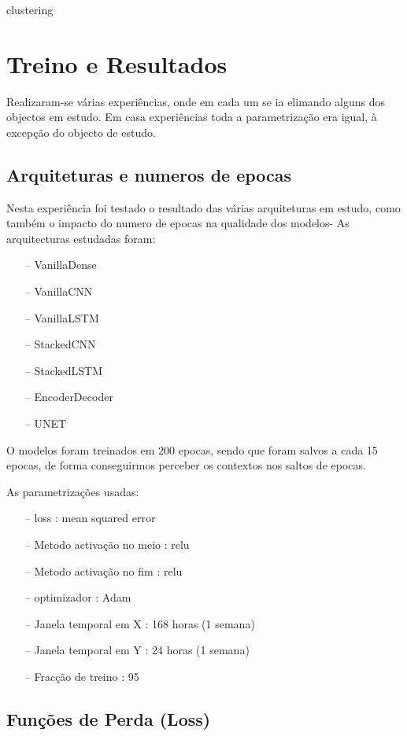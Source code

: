 clustering


\section{Treino e Resultados  \label{se:training}}

Realizaram-se várias experiências, onde em cada um se ia elimando alguns dos objectos em estudo.
Em casa experiências toda a parametrização era igual, à excepção do objecto de estudo.

\subsection{Arquiteturas e numeros de epocas}

Nesta experiência foi testado o resultado das várias arquiteturas em estudo, como também o impacto do numero de epocas na qualidade dos modelos-
As arquitecturas estudadas foram:

\begin{itemize}
    \item[--] VanillaDense
    \item[--] VanillaCNN
    \item[--] VanillaLSTM
    \item[--] StackedCNN
    \item[--] StackedLSTM
    \item[--] EncoderDecoder
    \item[--] UNET
\end{itemize}

O modelos foram treinados em 200 epocas, sendo que foram salvos a cada 15 epocas, de forma conseguirmos perceber os contextos nos saltos de epocas.

As parametrizações usadas:
\begin{itemize}
    \item[--] loss : mean squared error
    \item[--] Metodo activação no meio : relu
    \item[--] Metodo activação no fim : relu
    \item[--] optimizador : Adam
    \item[--] Janela temporal em X : 168 horas (1 semana)
    \item[--] Janela temporal em Y : 24 horas (1 semana)
    \item[--] Fracção de treino : 95%
\end{itemize}

\subsection{Funções de Perda (Loss)}


